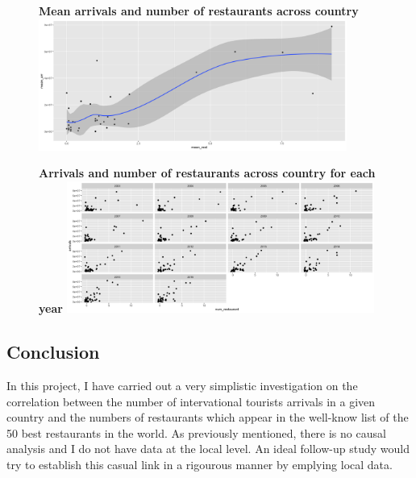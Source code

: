 \documentclass[]{article}
\begin{document}
\begin{figure}[H]
	\centering
	\textbf{Mean arrivals and number of restaurants across country}	\includegraphics[width=0.9\textwidth]{../../output/graphs/graph_1.png}
\end{figure}

\begin{figure}[H]
	\centering
	\textbf{Arrivals and number of restaurants across country for each year}
	\includegraphics[width=0.9\textwidth]{../../output/graphs/graph_2.png}
\end{figure}



\subsection{Conclusion}

In this project, I have carried out a very simplistic investigation on the correlation between the number of intervational tourists arrivals in a given country and the numbers of restaurants which appear in the well-know list of the 50 best restaurants in the world. As previously mentioned, there is no causal analysis and I do not have data at the local level. An ideal follow-up study would try to establish this casual link in a rigourous manner by emplying local data.
\end{document}
